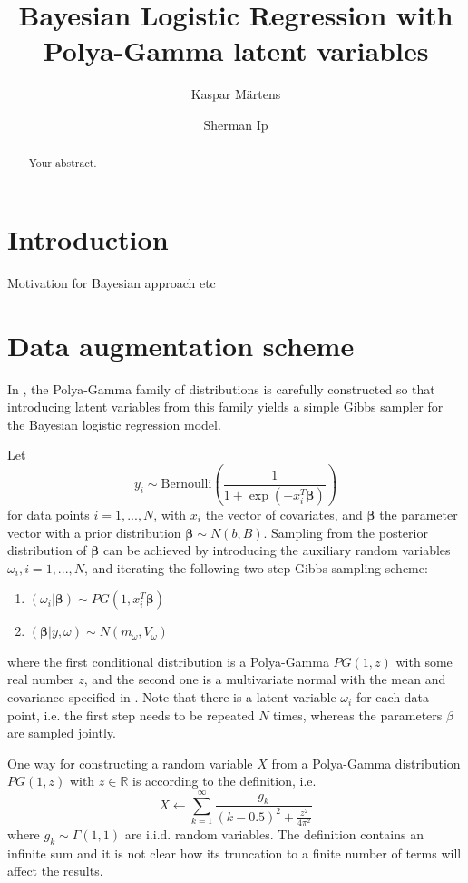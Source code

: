 \documentclass[a4paper]{article}\usepackage[]{graphicx}\usepackage[]{color}
\title{Bayesian Logistic Regression with Polya-Gamma latent variables}
\author{Kaspar Märtens \and Sherman Ip}
\newcommand{\boldbeta}{\boldsymbol{\beta}}
\newcommand{\Be}{\text{Bernoulli}}
\begin{document}
\maketitle

\begin{abstract}
Your abstract.
\end{abstract}

\section{Introduction}

Motivation for Bayesian approach etc

\section{Data augmentation scheme}

In \cite{polson2013bayesian}, the Polya-Gamma family of distributions is carefully constructed so that introducing latent variables from this family yields a simple Gibbs sampler for the Bayesian logistic regression model.

Let
\[
y_i \sim \Be\left( \frac{1}{1 + \exp(-x_i^T \boldbeta)} \right)
\]
for data points $i=1, ..., N$, with $x_i$ the vector of covariates, and $\boldbeta$ the parameter vector with a prior distribution $\boldbeta \sim N(b, B)$. Sampling from the posterior distribution of $\boldbeta$ can be achieved by introducing the auxiliary random variables $\omega_i, i=1, ..., N$, and iterating the following two-step Gibbs sampling scheme:

\begin{enumerate}
\item $(\omega_i | \boldbeta) \sim PG(1, x_i^T \boldbeta)$
\item $(\boldbeta | y, \omega) \sim N(m_\omega, V_\omega)$
\end{enumerate}

where the first conditional distribution is a Polya-Gamma $PG(1, z)$ with some real number $z$, and the second one is a multivariate normal with the mean and covariance specified in \cite{polson2013bayesian}.
Note that there is a latent variable $\omega_i$ for each data point, i.e. the first step needs to be repeated $N$ times, whereas the parameters $\beta$ are sampled jointly.

One way for constructing a random variable $X$ from a Polya-Gamma distribution $PG(1, z)$ with $z \in \mathbb{R}$ is according to the definition, i.e.
\[
X \gets \sum_{k=1}^\infty \frac{g_k}{(k-0.5)^2 + \frac{z^2}{4 \pi^2}}
\]
where $g_k \sim \Gamma(1, 1)$ are i.i.d. random variables. The definition contains an infinite sum and it is not clear how its truncation to a finite number of terms will affect the results.
\end{document}
